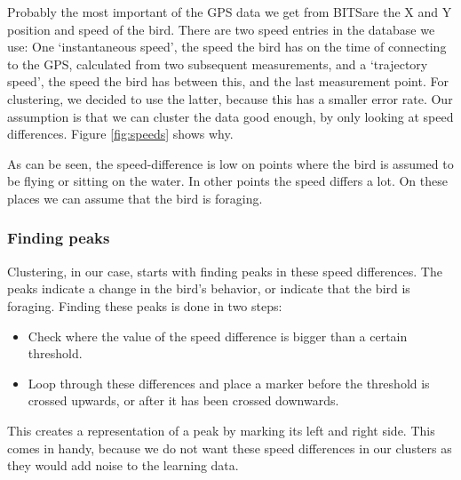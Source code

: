 \documentclass[a4paper, 11pt]{article}
\newcommand{\bits}{BITS}
\begin{document}
 Probably the most important of the GPS data we get from \bits are the X and Y
 position and speed of the bird. There are two speed entries in the database we
 use: One `instantaneous speed', the speed the bird has on the time of
 connecting to the GPS, calculated from two subsequent measurements, and a
 `trajectory speed', the speed the bird has between this, and the last
 measurement point. For clustering, we decided to use the latter, because this
 has a smaller error rate. Our assumption is that we can cluster the data good
 enough, by only looking at speed differences. Figure \ref{fig:speeds} shows
 why.

 As can be seen, the speed-difference is low on points where the bird is assumed
 to be flying or sitting on the water. In other points the speed differs a lot.
 On these places we can assume that the bird is foraging.

 \subsubsection{Finding peaks}
 Clustering, in our case, starts with finding peaks in these speed differences.
 The peaks indicate a change in the bird's behavior, or indicate that the bird
 is foraging. Finding these peaks is done in two steps:

 \begin{itemize}
    \item Check where the value of the speed difference is bigger than a certain
    threshold.
    \item Loop through these differences and place a marker before the threshold
    is crossed upwards, or after it has been crossed downwards. 
 \end{itemize}
 
 This creates a representation of a peak by marking its left and right side.
 This comes in handy, because we do not want these speed differences in our
 clusters as they would add noise to the learning data.
\end{document}

